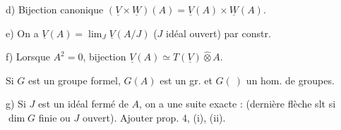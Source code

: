 d) Bijection canonique $(\underline V\times\underline W)(A)=\underline V(A)\times\underline W(A)$.

e) On a $\underline V(A)=\lim_J\underline V(A/J)$ ($J$ idéal ouvert) par constr.

f) Lorsque $A^2=0$, bijection $\underline V(A)\simeq T(\underline V)\mathbin{\widehat\otimes} A$.

Si $G$ est un groupe formel, $G(A)$ est un gr. et $G(\ )$ un hom. de groupes.

g) Si $J$ est un idéal fermé de $A$, on a une suite exacte :
(dernière flèche slt si $\dim G$ finie ou $J$ ouvert). Ajouter prop. 4, (i), (ii).
